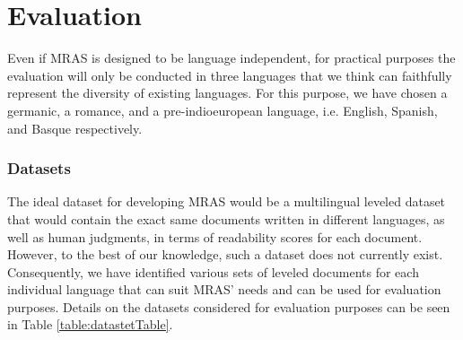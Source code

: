 \documentclass{bsu-ms}
\begin{document}
\chapter{Evaluation}



Even if MRAS is designed to be language independent, for practical purposes the evaluation will only be conducted in three languages that we think can faithfully represent the diversity of existing languages. For this purpose, we have chosen a germanic, a romance, and a pre-indioeuropean language, i.e. English, Spanish, and Basque respectively.


\subsection{Datasets}
The ideal dataset for developing MRAS would be a multilingual leveled dataset that would contain the exact same documents written in different languages, as well as human judgments, in terms of readability scores for each document. However, to the best of our knowledge, such a dataset does not currently exist. Consequently, we have identified various sets of leveled documents for each individual language that can suit MRAS' needs and can be used for evaluation purposes. Details on the datasets considered for evaluation purposes can be seen in Table \ref{table:datastetTable}.
\end{document}
